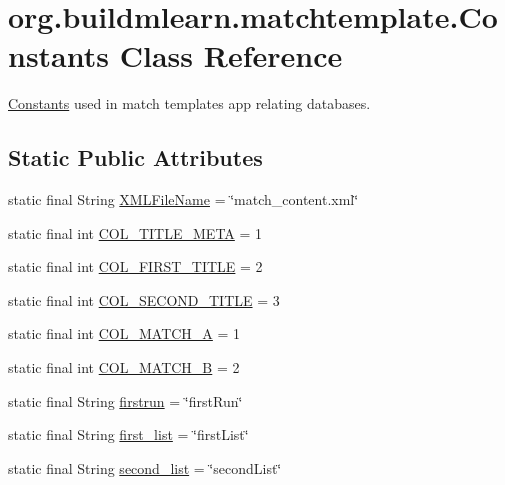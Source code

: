 \hypertarget{classorg_1_1buildmlearn_1_1matchtemplate_1_1Constants}{}\section{org.\+buildmlearn.\+matchtemplate.\+Constants Class Reference}
\label{classorg_1_1buildmlearn_1_1matchtemplate_1_1Constants}


\hyperlink{classorg_1_1buildmlearn_1_1matchtemplate_1_1Constants}{Constants} used in match template\textquotesingle{}s app relating databases.  


\subsection*{Static Public Attributes}
\begin{DoxyCompactItemize}
\item 
static final String \hyperlink{classorg_1_1buildmlearn_1_1matchtemplate_1_1Constants_a5f09a87abe3a26abff569523bb844890}{X\+M\+L\+File\+Name} = \char`\"{}match\+\_\+content.\+xml\char`\"{}
\item 
static final int \hyperlink{classorg_1_1buildmlearn_1_1matchtemplate_1_1Constants_af3aea4464b295798ac8358f2727fbc17}{C\+O\+L\+\_\+\+T\+I\+T\+L\+E\+\_\+\+M\+E\+TA} = 1
\item 
static final int \hyperlink{classorg_1_1buildmlearn_1_1matchtemplate_1_1Constants_a49c9f9cdb33700264b5352bde93dd2c5}{C\+O\+L\+\_\+\+F\+I\+R\+S\+T\+\_\+\+T\+I\+T\+LE} = 2
\item 
static final int \hyperlink{classorg_1_1buildmlearn_1_1matchtemplate_1_1Constants_ae614bea6289b4ee4a5e38bd2439fb913}{C\+O\+L\+\_\+\+S\+E\+C\+O\+N\+D\+\_\+\+T\+I\+T\+LE} = 3
\item 
static final int \hyperlink{classorg_1_1buildmlearn_1_1matchtemplate_1_1Constants_a10a034c2a9efac3ad3606afad2ea9bd6}{C\+O\+L\+\_\+\+M\+A\+T\+C\+H\+\_\+A} = 1
\item 
static final int \hyperlink{classorg_1_1buildmlearn_1_1matchtemplate_1_1Constants_ac7357fd84b733cec7b145fdf804729fb}{C\+O\+L\+\_\+\+M\+A\+T\+C\+H\+\_\+B} = 2
\item 
static final String \hyperlink{classorg_1_1buildmlearn_1_1matchtemplate_1_1Constants_ab91681928cb2288aea52530dbfb10ae2}{firstrun} = \char`\"{}first\+Run\char`\"{}
\item 
static final String \hyperlink{classorg_1_1buildmlearn_1_1matchtemplate_1_1Constants_ab7ad75500005e133dae0ee76de8c6c35}{first\+\_\+list} = \char`\"{}first\+List\char`\"{}
\item 
static final String \hyperlink{classorg_1_1buildmlearn_1_1matchtemplate_1_1Constants_a5689d08575841b2b21cf3ad703ca4587}{second\+\_\+list} = \char`\"{}second\+List\char`\"{}
\end{DoxyCompactItemize}



